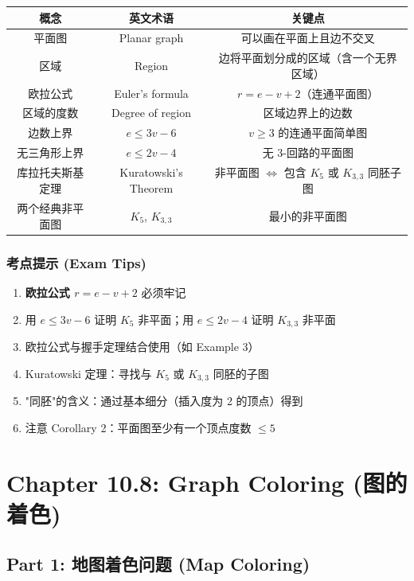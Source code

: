 \documentclass[10pt,a4paper,openany]{ctexbook}
\theoremstyle{definition}
\theoremstyle{remark}
\begin{document}
\begin{center}
\begin{tabular}{ccc}
\hline
概念 & 英文术语 & 关键点 \\ \hline
平面图 & Planar graph & 可以画在平面上且边不交叉 \\
区域 & Region & 边将平面划分成的区域（含一个无界区域） \\
欧拉公式 & Euler's formula & $r = e - v + 2$（连通平面图） \\
区域的度数 & Degree of region & 区域边界上的边数 \\
边数上界 & $e \le 3v-6$ & $v \ge 3$ 的连通平面简单图 \\
无三角形上界 & $e \le 2v-4$ & 无 3-回路的平面图 \\
库拉托夫斯基定理 & Kuratowski's Theorem & 非平面图 $\iff$ 包含 $K_5$ 或 $K_{3,3}$ 同胚子图 \\
两个经典非平面图 & $K_5$, $K_{3,3}$ & 最小的非平面图 \\
\hline
\end{tabular}

\end{center}

\subsubsection{考点提示 (Exam Tips)}

\begin{enumerate}
\item \textbf{欧拉公式 $r = e - v + 2$} 必须牢记
\item 用 $e \le 3v - 6$ 证明 $K_5$ 非平面；用 $e \le 2v - 4$ 证明 $K_{3,3}$ 非平面
\item 欧拉公式与握手定理结合使用（如 Example 3）
\item Kuratowski 定理：寻找与 $K_5$ 或 $K_{3,3}$ 同胚的子图
\item "同胚"的含义：通过基本细分（插入度为 2 的顶点）得到
\item 注意 Corollary 2：平面图至少有一个顶点度数 $\le 5$

\end{enumerate}


\section{Chapter 10.8: Graph Coloring (图的着色)}

\vspace{-2pt}

\subsection{Part 1: 地图着色问题 (Map Coloring)}
\end{document}
